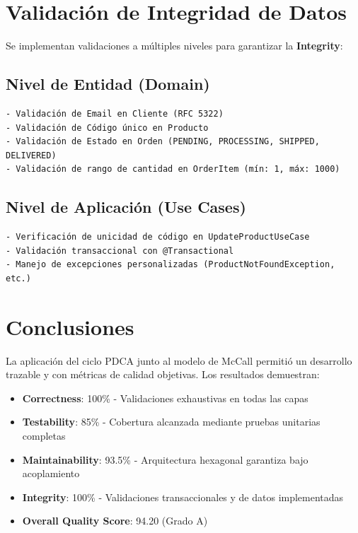 \documentclass[12pt,a4paper]{article}
\begin{document}
\section{Validación de Integridad de Datos}

Se implementan validaciones a múltiples niveles para garantizar la \textbf{Integrity}:

\subsection{Nivel de Entidad (Domain)}
\begin{verbatim}
- Validación de Email en Cliente (RFC 5322)
- Validación de Código único en Producto
- Validación de Estado en Orden (PENDING, PROCESSING, SHIPPED, DELIVERED)
- Validación de rango de cantidad en OrderItem (mín: 1, máx: 1000)
\end{verbatim}

\subsection{Nivel de Aplicación (Use Cases)}
\begin{verbatim}
- Verificación de unicidad de código en UpdateProductUseCase
- Validación transaccional con @Transactional
- Manejo de excepciones personalizadas (ProductNotFoundException, etc.)
\end{verbatim}

\section{Conclusiones}

La aplicación del ciclo PDCA junto al modelo de McCall permitió un desarrollo trazable y con métricas de calidad objetivas. Los resultados demuestran:

\begin{itemize}
    \item \textbf{Correctness}: 100\% - Validaciones exhaustivas en todas las capas
    \item \textbf{Testability}: 85\% - Cobertura alcanzada mediante pruebas unitarias completas
    \item \textbf{Maintainability}: 93.5\% - Arquitectura hexagonal garantiza bajo acoplamiento
    \item \textbf{Integrity}: 100\% - Validaciones transaccionales y de datos implementadas
    \item \textbf{Overall Quality Score}: 94.20 (Grado A)
\end{itemize}
\end{document}
